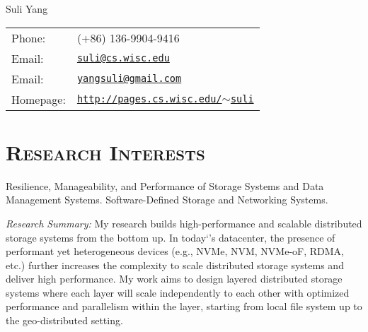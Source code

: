 \documentclass[10pt, letterpaper]{article}
\def\name{Suli Yang}
\begin{document}
{\huge \name}

\bigskip

\begin{minipage}{0.45\linewidth}
\hypersetup{urlcolor=black}
\begin{tabular}{ll}
  Phone: & (+86) 136-9904-9416\\
  Email: & \href{mailto:suli@cs.wisc.edu}{\tt suli@cs.wisc.edu}\\
  Email: & \href{mailto:yangsuli@gmail.com}{\tt yangsuli@gmail.com}\\
  Homepage: & \href{http://pages.cs.wisc.edu/~suli}
  	{\tt http://pages.cs.wisc.edu/$\sim$suli}
\end{tabular}
\end{minipage}

\section*{\textsc{Research Interests}}

Resilience, Manageability, and Performance of Storage Systems and Data Management Systems.
Software-Defined Storage and Networking Systems.

\vspace{0.15cm}
\noindent
{\textit{Research Summary:}} 
    My research builds high-performance and scalable distributed storage systems from the bottom up. 
    In today`’s datacenter, the presence of performant yet heterogeneous devices (e.g., NVMe, NVM, NVMe-oF, RDMA, etc.) further increases the complexity to scale distributed storage systems and deliver high performance. My work aims to design layered distributed storage systems where each layer will scale independently to each other with optimized performance and parallelism within the layer, starting from local file system up to the geo-distributed setting. 
    
\fi
\end{document}

